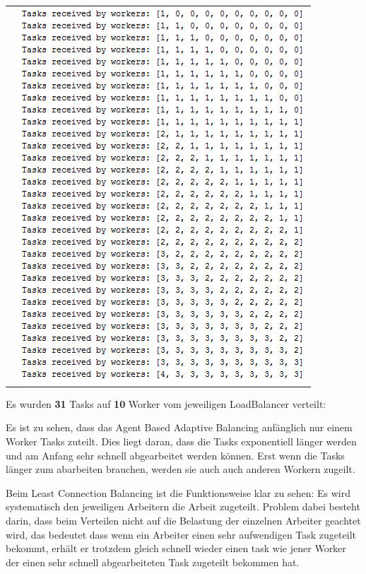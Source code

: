 \begin{table}[h!]
\begin{tabular}{c c}
		&
		\begin{minipage}{.5\textwidth}
			\includegraphics[width=\linewidth]{images/LC}
			\figcaption{Least Connection Balancing}
		\end{minipage}
		
		\\
	\end{tabular}
\end{table}

Es wurden \textbf{31} Tasks auf \textbf{10} Worker vom jeweiligen LoadBalancer verteilt:

Es ist zu sehen, dass das Agent Based Adaptive Balancing anfänglich nur einem Worker Tasks zuteilt. Dies liegt daran, dass die Tasks exponentiell länger werden und am Anfang sehr schnell abgearbeitet werden können. Erst wenn die Tasks länger zum abarbeiten brauchen, werden sie auch auch anderen Workern zugeilt.

Beim Least Connection Balancing ist die Funktionsweise klar zu sehen: Es wird systematisch den jeweiligen Arbeitern die Arbeit zugeteilt. Problem dabei besteht darin, dass beim Verteilen nicht auf die Belastung der einzelnen Arbeiter geachtet wird, das bedeutet dass wenn ein Arbeiter einen sehr aufwendigen Task zugeteilt bekommt, erhält er trotzdem gleich schnell wieder einen task wie jener Worker der einen sehr schnell abgearbeiteten Task zugeteilt bekommen hat.

